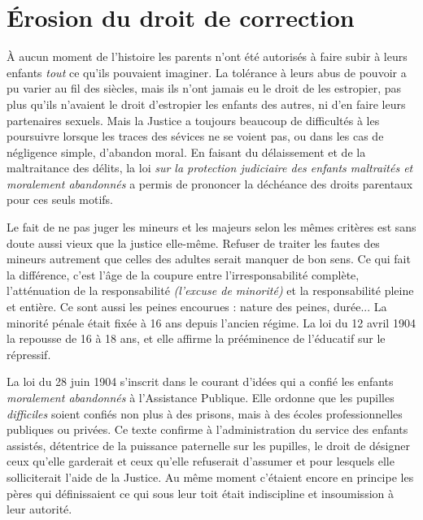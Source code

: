 \section{Érosion du droit de correction}

 À aucun moment de l'histoire les parents n'ont été autorisés à faire subir à leurs enfants \emph{tout} ce qu'ils pouvaient imaginer. La tolérance à leurs abus de pouvoir a pu varier au fil des siècles, mais ils n'ont jamais eu le droit de les estropier, pas plus qu'ils n'avaient le droit d'estropier les enfants des autres, ni d'en faire leurs partenaires sexuels. Mais la Justice a toujours beaucoup de difficultés à les poursuivre lorsque les traces des sévices ne se voient pas, ou dans les cas de négligence simple, d'abandon moral. En faisant du délaissement et de la maltraitance des délits, la loi {\emph{sur la protection judiciaire des enfants maltraités et moralement abandonnés}} a permis de prononcer la déchéance des droits parentaux pour ces seuls motifs. 

 Le fait de ne pas juger les mineurs et les majeurs selon les mêmes critères est sans doute aussi vieux que la justice elle-même. Refuser de traiter les fautes des mineurs autrement que celles des adultes serait manquer de bon sens. Ce qui fait la différence, c'est l'âge de la coupure entre l'irresponsabilité complète, l'atténuation de la responsabilité \emph{(l'excuse de minorité)} et la responsabilité pleine et entière. Ce sont aussi les peines encourues : nature des peines, durée... La minorité pénale était fixée à 16 ans depuis l'ancien régime. La loi du 12 avril 1904 la repousse de 16 à 18 ans, et elle affirme la prééminence de l'éducatif sur le répressif.

 La loi du 28 juin 1904 s'inscrit dans le courant d'idées qui a confié les enfants \emph{moralement abandonnés} à l'Assistance Publique. Elle ordonne que les pupilles \emph{difficiles} soient confiés non plus à des prisons, mais à des écoles professionnelles publiques ou privées. Ce texte confirme à l'administration du service des enfants assistés, détentrice de la puissance paternelle sur les pupilles, le droit de désigner ceux qu'elle garderait et ceux qu'elle refuserait d'assumer et pour lesquels elle solliciterait l'aide de la Justice. Au même moment c'étaient encore en principe les pères qui définissaient ce qui sous leur toit était indiscipline et insoumission à leur autorité.

